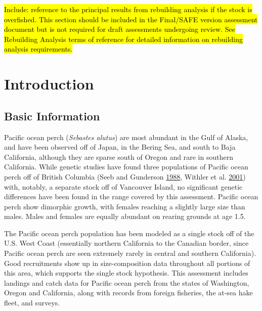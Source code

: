 \documentclass[12pt,]{article}
\begin{document}
\hl{Include: reference to the principal results from rebuilding analysis if the 
stock is overfished. This section should be included in the Final/SAFE version 
assessment document but is not required for draft assessments undergoing review. 
See Rebuilding Analysis terms of reference for detailed information on 
rebuilding analysis requirements.}

\FloatBarrier

\newpage

\renewcommand{\thefigure}{\arabic{figure}}
\renewcommand{\thetable}{\arabic{table}}

\setcounter{figure}{0} \setcounter{table}{0}

\section{Introduction}\label{introduction}

\subsection{Basic Information}\label{basic-information}

Pacific ocean perch (\emph{Sebastes alutus}) are most abundant in the
Gulf of Alaska, and have been observed off of Japan, in the Bering Sea,
and south to Baja California, although they are sparse south of Oregon
and rare in southern California. While genetic studies have found three
populations of Pacific ocean perch off of British Columbia (Seeb and
Gunderson \protect\hyperlink{ref-seeb_genetic_1988}{1988}, Withler et
al. \protect\hyperlink{ref-withler_co-existing_2001}{2001}) with,
notably, a separate stock off of Vancouver Island, no significant
genetic differences have been found in the range covered by this
assessment. Pacific ocean perch show dimorphic growth, with females
reaching a slightly large size than males. Males and females are equally
abundant on rearing grounds at age 1.5.

The Pacific ocean perch population has been modeled as a single stock
off of the U.S. West Coast (essentially northern California to the
Canadian border, since Pacific ocean perch are seen extremely rarely in
central and southern California). Good recruitments show up in
size-composition data throughout all portions of this area, which
supports the single stock hypothesis. This assessment includes landings
and catch data for Pacific ocean perch from the states of Washington,
Oregon and California, along with records from foreign fisheries, the
at-sea hake fleet, and surveys.
\end{document}
